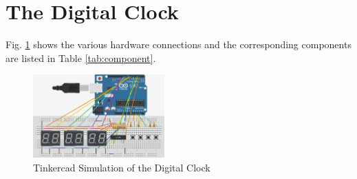 \documentclass[conference]{IEEEtran}
\begin{document}
\section{The Digital Clock}
Fig. \ref{fig:tinker}  shows the various hardware connections and the corresponding components are listed in 
Table \ref{tab:component}.
\begin{figure}[!ht]
\centering
\includegraphics[width=0.45\textwidth]{figs/Clock_Tinkercad.png}
\caption{Tinkercad Simulation of the Digital Clock}
\label{fig:tinker}
\end{figure}
\begin{table}[!h]
\centering

\caption{Table 1.0: Components List}
\label{tab:component}
\end{table}
%












\end{document}
